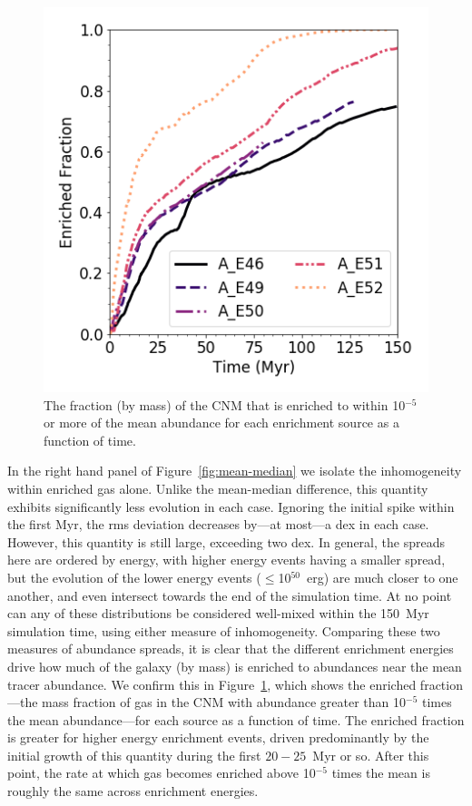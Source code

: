 \documentclass[twocolumn]{aastex62}
\begin{document}
\begin{figure}
  \centering
\includegraphics[width=0.95\linewidth]{CNM_enriched}
\caption{The fraction (by mass) of the CNM that is enriched to within 10$^{-5}$ or more of the mean abundance for each enrichment source as a function of time.}
  \label{fig:enrichment_fraction}
\end{figure}

In the right hand panel of Figure~\ref{fig:mean-median} we isolate the inhomogeneity within enriched gas alone. Unlike the mean-median difference, this quantity exhibits significantly less evolution in each case. Ignoring the initial spike within the first Myr, the rms deviation decreases by---at most---a dex in each case. However, this quantity is still large, exceeding two dex. In general, the spreads here are ordered by energy, with higher energy events having a smaller spread, but the evolution of the lower energy events ($\leq$10$^{50}$~erg) are much closer to one another, and even intersect towards the end of the simulation time. At no point can any of these distributions be considered well-mixed within the 150~Myr simulation time, using either measure of inhomogeneity. Comparing these two measures of abundance spreads, it is clear that the different enrichment energies drive how much of the galaxy (by mass) is enriched to abundances near the mean tracer abundance. We confirm this in Figure~\ref{fig:enrichment_fraction}, which shows the enriched fraction---the mass fraction of gas in the CNM with abundance greater than 10$^{-5}$ times the mean abundance---for each source as a function of time. The enriched fraction is greater for higher energy enrichment events, driven predominantly by the initial growth of this quantity during the first $20-25$~Myr or so. After this point, the rate at which gas becomes enriched above 10$^{-5}$ times the mean is roughly the same across enrichment energies.
\end{document}
